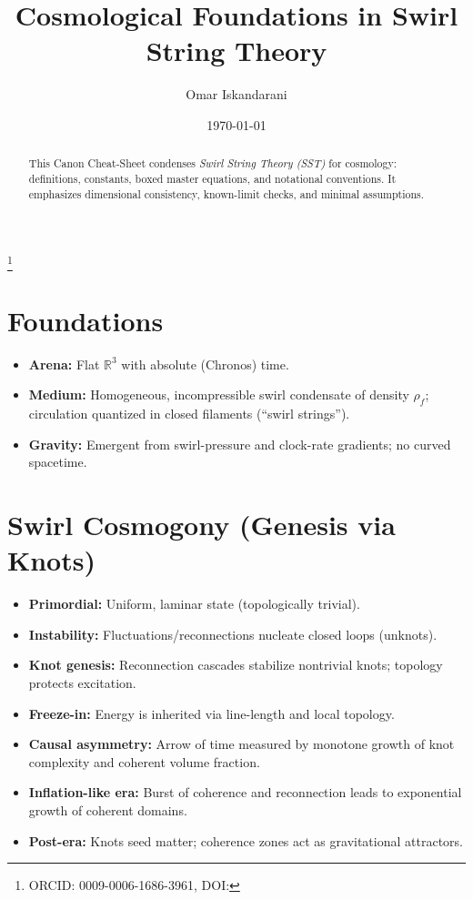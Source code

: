 \documentclass[10pt,reprint,aps,onecolumn,nofootinbib]{revtex4-2}
\newcommand{\rhof}{\rho_{\!f}}
\begin{document}
\title{Cosmological Foundations in Swirl String Theory}
\author{Omar Iskandarani}
\thanks{ORCID: 0009-0006-1686-3961, DOI: \paperdoi}
\date{\today}

\begin{abstract}
This Canon Cheat-Sheet condenses \emph{Swirl String Theory (SST)} for cosmology: definitions, constants, boxed master equations, and notational conventions. It emphasizes dimensional consistency, known-limit checks, and minimal assumptions.
\end{abstract}

\maketitle

\section*{Foundations}
\begin{itemize}
  \item \textbf{Arena:} Flat \( \mathbb{R}^3 \) with absolute (Chronos) time.
  \item \textbf{Medium:} Homogeneous, incompressible swirl condensate of density \( \rhof \); circulation quantized in closed filaments (``swirl strings'').
  \item \textbf{Gravity:} Emergent from swirl-pressure and clock-rate gradients; no curved spacetime.
\end{itemize}

\section*{Swirl Cosmogony (Genesis via Knots)}
\begin{itemize}
  \item \textbf{Primordial:} Uniform, laminar state (topologically trivial).
  \item \textbf{Instability:} Fluctuations/reconnections nucleate closed loops (unknots).
  \item \textbf{Knot genesis:} Reconnection cascades stabilize nontrivial knots; topology protects excitation.
  \item \textbf{Freeze-in:} Energy is inherited via line-length and local topology.
  \item \textbf{Causal asymmetry:} Arrow of time measured by monotone growth of knot complexity and coherent volume fraction.
  \item \textbf{Inflation-like era:} Burst of coherence and reconnection leads to exponential growth of coherent domains.
  \item \textbf{Post-era:} Knots seed matter; coherence zones act as gravitational attractors.
\end{itemize}
\end{document}
